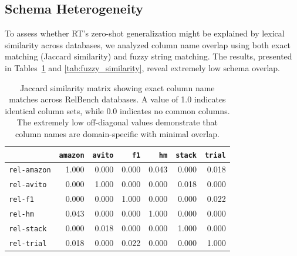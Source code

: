 \subsection{Schema Heterogeneity}


To assess whether RT's zero-shot generalization might be explained by lexical similarity across databases, we analyzed column name overlap using both exact matching (Jaccard similarity) and fuzzy string matching. The results, presented in Tables~\ref{tab:jaccard_similarity} and \ref{tab:fuzzy_similarity}, reveal extremely low schema overlap.


\begin{table}[t]
\centering
\scriptsize

\begin{tabular}{lrrrrrr}
\toprule
 & \texttt{amazon} & \texttt{avito} & \texttt{f1} & \texttt{hm} & \texttt{stack} & \texttt{trial} \\
\midrule
\texttt{rel-amazon} & 1.000 & 0.000 & 0.000 & 0.043 & 0.000 & 0.018 \\
\texttt{rel-avito}  & 0.000 & 1.000 & 0.000 & 0.000 & 0.018 & 0.000 \\
\texttt{rel-f1}     & 0.000 & 0.000 & 1.000 & 0.000 & 0.000 & 0.022 \\
\texttt{rel-hm}     & 0.043 & 0.000 & 0.000 & 1.000 & 0.000 & 0.000 \\
\texttt{rel-stack}  & 0.000 & 0.018 & 0.000 & 0.000 & 1.000 & 0.000 \\
\texttt{rel-trial}  & 0.018 & 0.000 & 0.022 & 0.000 & 0.000 & 1.000 \\
\bottomrule
\end{tabular}

\caption{Jaccard similarity matrix showing exact column name matches across RelBench databases. A value of 1.0 indicates identical column sets, while 0.0 indicates no common columns. The extremely low off-diagonal values demonstrate that column names are domain-specific with minimal overlap.}
\label{tab:jaccard_similarity}
\end{table}

